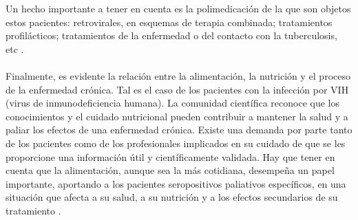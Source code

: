 \documentclass[a4paper,twocolumn,10pt]{article}
\begin{document}
Un hecho importante a tener en cuenta es la polimedicación de la que son objetos estos pacientes: retrovirales, en esquemas de terapia combinada; tratamientos profilácticos; tratamientos de la enfermedad o del contacto con la tuberculosis, etc \cite{Ferri2002}. \\ \\
Finalmente, es evidente la relación entre la alimentación, la nutrición y el proceso de la enfermedad crónica. Tal es el caso de los pacientes con la infección por VIH (virus de inmunodeficiencia humana). La comunidad científica reconoce que los conocimientos y el cuidado nutricional pueden contribuir a mantener la salud y a paliar los efectos de una enfermedad crónica. Existe una demanda por parte tanto de los pacientes como de los profesionales implicados en su cuidado de que se les proporcione una información útil y científicamente validada. Hay que tener en cuenta que la alimentación, aunque sea la más cotidiana, desempeña un papel importante, aportando a los pacientes seropositivos paliativos específicos, en una situación que afecta a su salud, a su nutrición y a los efectos secundarios de su tratamiento \cite{Herrera2004}.
\end{document}
